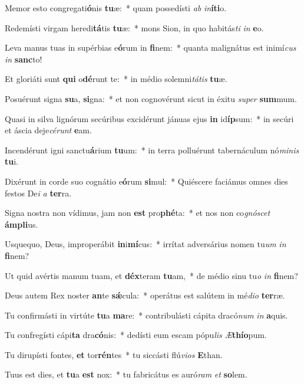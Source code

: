 \item Memor esto congregati\textbf{ó}nis \textbf{tu}æ:~* quam possedísti \textit{ab} \textit{in}\textbf{í}\textbf{ti}o.
\item Redemísti virgam heredi\textbf{tá}tis \textbf{tu}æ:~* mons Sion, in quo habitás\textit{ti} \textit{in} \textbf{e}o.
\item Leva manus tuas in supérbias e\textbf{ó}rum in \textbf{fi}nem:~* quanta malignátus est inimí\textit{cus} \textit{in} \textbf{sanc}to!
\item Et gloriáti sunt \textbf{qui} o\textbf{dé}runt te:~* in médio solemni\textit{tá}\textit{tis} \textbf{tu}æ.
\item Posuérunt signa \textbf{su}a, \textbf{si}gna:~* et non cognovérunt sicut in éxitu \textit{su}\textit{per} \textbf{sum}mum.
\item Quasi in silva lignórum secúribus excidérunt jánuas ejus \textbf{in} id\textbf{íp}sum:~* in secúri et áscia deje\textit{cé}\textit{runt} \textbf{e}am.
\item Incendérunt igni sanctu\textbf{á}rium \textbf{tu}um:~* in terra polluérunt tabernáculum nó\textit{mi}\textit{nis} \textbf{tu}i.
\item Dixérunt in corde suo cognátio e\textbf{ó}rum \textbf{si}mul:~* Quiéscere faciámus omnes dies festos De\textit{i} \textit{a} \textbf{ter}ra.
\item Signa nostra non vídimus, jam non \textbf{est} pro\textbf{phé}ta:~* et nos non co\textit{gnó}\textit{scet} \textbf{ám}\textbf{pli}us.
\item Usquequo, Deus, improperábit \textbf{in}i\textbf{mí}cus:~* irrítat adversárius nomen tu\textit{um} \textit{in} \textbf{fi}nem?
\item Ut quid avértis manum tuam, et \textbf{déx}teram \textbf{tu}am,~* de médio sinu tu\textit{o} \textit{in} \textbf{fi}nem?
\item Deus autem Rex noster \textbf{an}te \textbf{sǽ}cula:~* operátus est salútem in mé\textit{di}\textit{o} \textbf{ter}ræ.
\item Tu confirmásti in virtúte \textbf{tu}a \textbf{ma}re:~* contribulásti cápita dracó\textit{num} \textit{in} \textbf{a}quis.
\item Tu confregísti cápi\textbf{ta} dra\textbf{có}nis:~* dedísti eum escam pópu\textit{lis} \textit{Æ}\textbf{thí}\textbf{o}pum.
\item Tu dirupísti fontes, \textbf{et} tor\textbf{rén}tes~* tu siccásti flú\textit{vi}\textit{os} \textbf{E}than.
\item Tuus est dies, et \textbf{tu}a \textbf{est} nox:~* tu fabricátus es auró\textit{ram} \textit{et} \textbf{so}lem.
